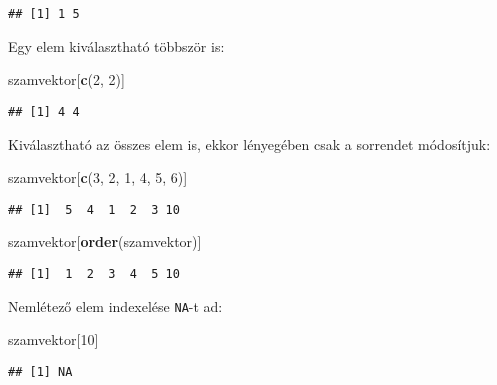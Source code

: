 \documentclass[]{book}
\newenvironment{Shaded}{\begin{snugshade}}{\end{snugshade}}
\newcommand{\KeywordTok}[1]{\textcolor[rgb]{0.13,0.29,0.53}{\textbf{#1}}}
\newcommand{\DecValTok}[1]{\textcolor[rgb]{0.00,0.00,0.81}{#1}}
\newcommand{\NormalTok}[1]{#1}
\begin{document}
\begin{verbatim}
## [1] 1 5
\end{verbatim}

Egy elem kiválasztható többször is:

\begin{Shaded}
\begin{Highlighting}[]
\NormalTok{szamvektor[}\KeywordTok{c}\NormalTok{(}\DecValTok{2}\NormalTok{, }\DecValTok{2}\NormalTok{)]}
\end{Highlighting}
\end{Shaded}

\begin{verbatim}
## [1] 4 4
\end{verbatim}

Kiválasztható az összes elem is, ekkor lényegében csak a sorrendet
módosítjuk:

\begin{Shaded}
\begin{Highlighting}[]
\NormalTok{szamvektor[}\KeywordTok{c}\NormalTok{(}\DecValTok{3}\NormalTok{, }\DecValTok{2}\NormalTok{, }\DecValTok{1}\NormalTok{, }\DecValTok{4}\NormalTok{, }\DecValTok{5}\NormalTok{, }\DecValTok{6}\NormalTok{)]}
\end{Highlighting}
\end{Shaded}

\begin{verbatim}
## [1]  5  4  1  2  3 10
\end{verbatim}

\begin{Shaded}
\begin{Highlighting}[]
\NormalTok{szamvektor[}\KeywordTok{order}\NormalTok{(szamvektor)]}
\end{Highlighting}
\end{Shaded}

\begin{verbatim}
## [1]  1  2  3  4  5 10
\end{verbatim}

Nemlétező elem indexelése \texttt{NA}-t ad:

\begin{Shaded}
\begin{Highlighting}[]
\NormalTok{szamvektor[}\DecValTok{10}\NormalTok{]}
\end{Highlighting}
\end{Shaded}

\begin{verbatim}
## [1] NA
\end{verbatim}
\end{document}
